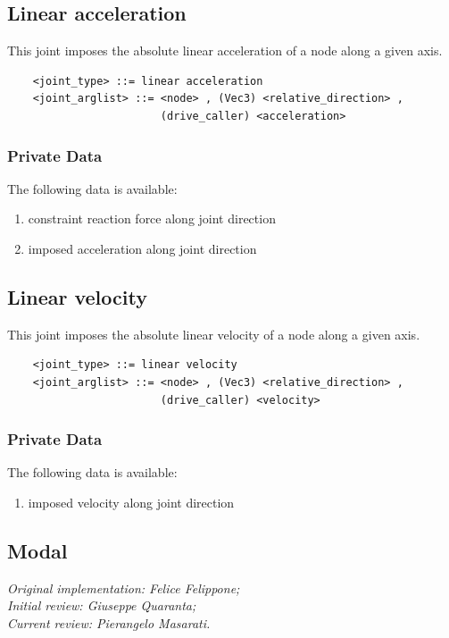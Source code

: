 \subsection{Linear acceleration}
This joint imposes the absolute linear acceleration of a node
along a given axis.
\begin{verbatim}
    <joint_type> ::= linear acceleration
    <joint_arglist> ::= <node> , (Vec3) <relative_direction> , 
                        (drive_caller) <acceleration>
\end{verbatim}

\subsubsection{Private Data}
The following data is available:
\begin{enumerate}
\item {} constraint reaction force along joint direction
\item {} imposed acceleration along joint direction
\end{enumerate}

\subsection{Linear velocity}
This joint imposes the absolute linear velocity of a node
along a given axis.
\begin{verbatim}
    <joint_type> ::= linear velocity
    <joint_arglist> ::= <node> , (Vec3) <relative_direction> , 
                        (drive_caller) <velocity>
\end{verbatim}

\subsubsection{Private Data}
The following data is available:
\begin{enumerate}
\item {} imposed velocity along joint direction
\end{enumerate}

\subsection{Modal}\label{sec:EL:STRUCT:JOINT:MODAL}
\emph{
Original implementation: Felice Felippone; \\
Initial review: Giuseppe Quaranta; \\
Current review: Pierangelo Masarati.}

